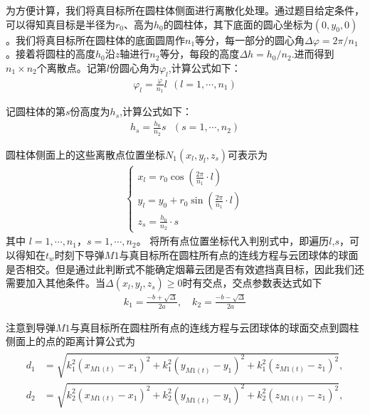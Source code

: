 \documentclass[../main.tex]{subfiles}
\begin{document}
\par 为方便计算，我们将真目标所在圆柱体侧面进行离散化处理。通过题目给定条件，可以得知真目标是半径为$r_0$、高为$h_0$的圆柱体，其下底面的圆心坐标为$\left( 0,y_0,0 \right)$。我们将真目标所在圆柱体的底面圆周作$n_1$等分，每一部分的圆心角$\varDelta \varphi =2\pi /n_1$。接着将圆柱的高度$h_0$沿$z$轴进行$n_2$等分，每段的高度$\varDelta h=h_0/n_2$.进而得到$n_1\times n_2$个离散点。记第$l$份圆心角为$\varphi _l$,计算公式如下：
\begin{align}\label{1.13}
	\varphi _l=\frac{\varphi}{n_1}l\ \ \left( l=1,\cdots,n_1 \right) 
\end{align}
\par 记圆柱体的第$s$份高度为$h_s$,计算公式如下：
\begin{align}\label{1.14}
	h_s=\frac{h_0}{n_2}s\,\,\,\,\left( s=1,\cdots,n_2 \right) 
\end{align}
\par 圆柱体侧面上的这些离散点位置坐标$N_1\left( x_l,y_l,z_s \right) $可表示为
\begin{align}
	\begin{cases}\label{1.15}
x_l = r_0 \cos\left( \frac{2\pi}{n_1} \cdot l \right) \\
y_l = y_0 + r_0 \sin\left( \frac{2\pi}{n_1} \cdot l \right) \\
z_s = \frac{h_0}{n_2} \cdot s
\end{cases}
\end{align}	
其中 \( l = 1, \cdots, n_1 \)，\( s = 1, \cdots, n_2 \)。
将所有点位置坐标代入判别式中，即遍历$l$,$s$，可以得知在$t_w$时刻下导弹$M1$与真目标所在圆柱所有点的连线方程与云团球体的球面是否相交。但是通过此判断式不能确定烟幕云团是否有效遮挡真目标，因此我们还需要加入其他条件。当$\Delta \left( x_l,y_l,z_s \right) \ge 0$时有交点，交点参数表达式如下
\begin{align}\label{1.16}
k_1 = \frac{-b + \sqrt{\Delta}}{2a}, \quad k_2 = \frac{-b - \sqrt{\Delta}}{2a}
\end{align}
\par 注意到导弹$M1$与真目标所在圆柱所有点的连线方程与云团球体的球面交点到圆柱侧面上的点的距离计算公式为
\begin{align}\label{1.17}
	\begin{aligned}
d_1 &= \sqrt{k_1^2(x_{M1(t)} - x_1)^2 + k_1^2(y_{M1(t)} - y_1)^2 + k_1^2(z_{M1(t)} - z_1)^2}, \\
d_2 &= \sqrt{k_2^2(x_{M1(t)} - x_1)^2 + k_2^2(y_{M1(t)} - y_1)^2 + k_2^2(z_{M1(t)} - z_1)^2},
\end{aligned}
\end{align}
\end{document}
